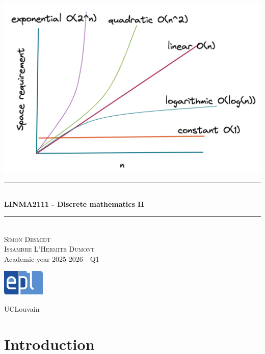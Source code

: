 \documentclass[12pt, openany]{report}
\newcommand{\HRule}{\rule{\linewidth}{0.5mm}}
\theoremstyle{definition}
\begin{document}
\begin{titlepage}
    \begin{sffamily}
    \begin{center}
        \includegraphics[scale=0.25]{img/page_de_garde.png} \\[1cm]
        \HRule \\[0.4cm]
        { \huge \bfseries LINMA2111 - Discrete mathematics II \\[0.4cm] }
    
        \HRule \\[1.5cm]
        \textsc{\LARGE Simon Desmidt\\ Issambre L'Hermite Dumont}\\[1cm]
        \vfill
        \vspace{2cm}
        {\large Academic year 2025-2026 - Q1}
        \vspace{0.4cm}
         
        \includegraphics[width=0.15\textwidth]{img/epl.png}
        
        UCLouvain\\
    
    \end{center}
    \end{sffamily}
\end{titlepage}

\setcounter{tocdepth}{1}
\tableofcontents
\chapter{Introduction}
\end{document}

